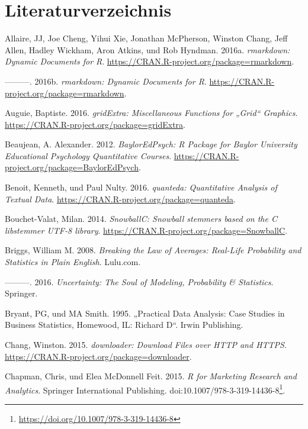 \documentclass[12pt,ngerman,]{book}
\let\rmarkdownfootnote\footnote%
\def\footnote{\protect\rmarkdownfootnote}
\renewcommand{\href}[2]{#2\footnote{\url{#1}}}
\begin{document}
\chapter{Literaturverzeichnis}\label{literaturverzeichnis}

\hypertarget{refs}{}
\hypertarget{ref-rmarkdown}{}
Allaire, JJ, Joe Cheng, Yihui Xie, Jonathan McPherson, Winston Chang,
Jeff Allen, Hadley Wickham, Aron Atkins, und Rob Hyndman. 2016a.
\emph{rmarkdown: Dynamic Documents for R}.
\url{https://CRAN.R-project.org/package=rmarkdown}.

\hypertarget{ref-R-rmarkdown}{}
---------. 2016b. \emph{rmarkdown: Dynamic Documents for R}.
\url{https://CRAN.R-project.org/package=rmarkdown}.

\hypertarget{ref-R-gridExtra}{}
Auguie, Baptiste. 2016. \emph{gridExtra: Miscellaneous Functions for
„Grid`` Graphics}. \url{https://CRAN.R-project.org/package=gridExtra}.

\hypertarget{ref-R-BaylorEdPsych}{}
Beaujean, A. Alexander. 2012. \emph{BaylorEdPsych: R Package for Baylor
University Educational Psychology Quantitative Courses}.
\url{https://CRAN.R-project.org/package=BaylorEdPsych}.

\hypertarget{ref-R-quanteda}{}
Benoit, Kenneth, und Paul Nulty. 2016. \emph{quanteda: Quantitative
Analysis of Textual Data}.
\url{https://CRAN.R-project.org/package=quanteda}.

\hypertarget{ref-R-SnowballC}{}
Bouchet-Valat, Milan. 2014. \emph{SnowballC: Snowball stemmers based on
the C libstemmer UTF-8 library}.
\url{https://CRAN.R-project.org/package=SnowballC}.

\hypertarget{ref-breaking}{}
Briggs, William M. 2008. \emph{Breaking the Law of Averages: Real-Life
Probability and Statistics in Plain English}. Lulu.com.

\hypertarget{ref-uncertainty}{}
---------. 2016. \emph{Uncertainty: The Soul of Modeling, Probability \&
Statistics}. Springer.

\hypertarget{ref-bryant1995practical}{}
Bryant, PG, und MA Smith. 1995. „Practical Data Analysis: Case Studies
in Business Statistics, Homewood, IL: Richard D``. Irwin Publishing.

\hypertarget{ref-R-downloader}{}
Chang, Winston. 2015. \emph{downloader: Download Files over HTTP and
HTTPS}. \url{https://CRAN.R-project.org/package=downloader}.

\hypertarget{ref-Chapman2015}{}
Chapman, Chris, und Elea McDonnell Feit. 2015. \emph{R for Marketing
Research and Analytics}. Springer International Publishing.
doi:\href{https://doi.org/10.1007/978-3-319-14436-8}{10.1007/978-3-319-14436-8}.
\end{document}
